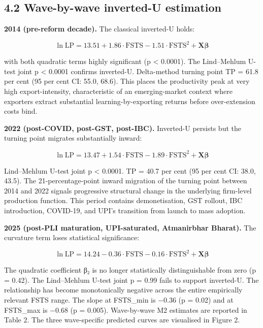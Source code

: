 \documentclass[
  12pt]{article}
\begin{document}
\hypertarget{wave-by-wave-inverted-u-estimation}{%
\subsection{4.2 Wave-by-wave inverted-U
estimation}\label{wave-by-wave-inverted-u-estimation}}

\textbf{2014 (pre-reform decade).} The classical inverted-U holds:

\[\ln\text{LP} = 13.51 + 1.86 \cdot \text{FSTS} - 1.51 \cdot \text{FSTS}^2 + \mathbf{X}\boldsymbol{\beta}\]

with both quadratic terms highly significant (p \textless{} 0.0001). The
Lind--Mehlum U-test joint p \textless{} 0.0001 confirms inverted-U.
Delta-method turning point TP = 61.8 per cent (95 per cent CI: 55.0,
68.6). This places the productivity peak at very high export-intensity,
characteristic of an emerging-market context where exporters extract
substantial learning-by-exporting returns before over-extension costs
bind.

\textbf{2022 (post-COVID, post-GST, post-IBC).} Inverted-U persists but
the turning point migrates substantially inward:

\[\ln\text{LP} = 13.47 + 1.54 \cdot \text{FSTS} - 1.89 \cdot \text{FSTS}^2 + \mathbf{X}\boldsymbol{\beta}\]

Lind--Mehlum U-test joint p \textless{} 0.0001. TP = 40.7 per cent (95
per cent CI: 38.0, 43.5). The 21-percentage-point inward migration of
the turning point between 2014 and 2022 signals progressive structural
change in the underlying firm-level production function. This period
contains demonetisation, GST rollout, IBC introduction, COVID-19, and
UPI's transition from launch to mass adoption.

\textbf{2025 (post-PLI maturation, UPI-saturated, Atmanirbhar Bharat).}
The curvature term loses statistical significance:

\[\ln\text{LP} = 14.24 - 0.36 \cdot \text{FSTS} - 0.16 \cdot \text{FSTS}^2 + \mathbf{X}\boldsymbol{\beta}\]

The quadratic coefficient β₂ is no longer statistically distinguishable
from zero (p = 0.42). The Lind--Mehlum U-test joint p = 0.99 fails to
support inverted-U. The relationship has become monotonically negative
across the entire empirically relevant FSTS range. The slope at
FSTS\_min is −0.36 (p = 0.02) and at FSTS\_max is −0.68 (p = 0.005).
Wave-by-wave M2 estimates are reported in Table 2. The three
wave-specific predicted curves are visualised in Figure 2.
\end{document}
